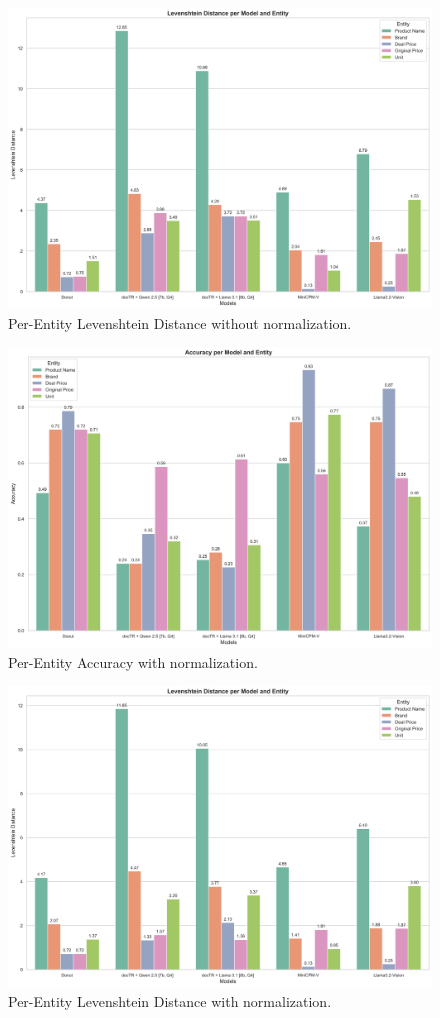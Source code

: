 \documentclass[11pt]{article}
\begin{document}
\begin{figure}[h!]
    \centering
    \includegraphics[width=0.8\linewidth]{figures/eval_final_levdis_raw.png}
    \caption{Per-Entity Levenshtein Distance without normalization.}
    \label{fig:eval_final_levdis_raw}
\end{figure}

\begin{figure}[h!]
    \centering
    \includegraphics[width=0.8\linewidth]{figures/eval_final_acc_norm.png}
    \caption{Per-Entity Accuracy with normalization.}
    \label{fig:eval_final_acc_norm}
\end{figure}

\begin{figure}[h!]
    \centering
    \includegraphics[width=0.8\linewidth]{figures/eval_final_levdis_norm.png}
    \caption{Per-Entity Levenshtein Distance with normalization.}
    \label{fig:eval_final_levdis_norm}
\end{figure}
\end{document}
